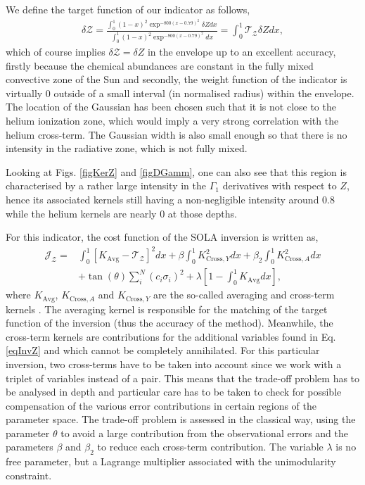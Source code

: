 \documentclass[a4paper,fleqn,usenatbib]{mnras}
\begin{document}
We define the target function of our indicator as follows,
\begin{align}
\delta \mathcal{Z}= \frac{\int_{0}^{1} (1-x)^{2} \exp^{-800(x-0.79)^{2}} \delta Z dx}{\int_{0}^{1} (1-x)^{2} \exp^{-800(x-0.79)^{2}}dx} = \int_{0}^{1}\mathcal{T}_{\mathcal{Z}} \delta Z dx \label{eq:TarZ},
\end{align}
which of course implies $\delta \mathcal{Z} = \delta Z$ in the envelope up to an excellent accuracy, firstly because the chemical abundances are constant in the fully mixed convective zone of the Sun and secondly, the weight function of the indicator is virtually $0$ outside of a small interval (in normalised radius) within the envelope. The location of the Gaussian has been chosen such that it is not close to the helium ionization zone, which would imply a very strong correlation with the helium cross-term. The Gaussian width is also small enough so that there is no intensity in the radiative zone, which is not fully mixed. 

Looking at Figs. \ref{figKerZ} and \ref{figDGamm}, one can also see that this region is characterised by a rather large intensity in the $\Gamma_{1}$ derivatives with respect to $Z$, hence its associated kernels still having a non-negligible intensity around $0.8$ while the helium kernels are nearly $0$ at those depths. 

For this indicator, the cost function of the SOLA inversion is written as,
\begin{align}
\mathcal{J}_{\mathcal{Z}} = & \int_{0}^{1}\left[ K_{\mathrm{Avg}}-\mathcal{T}_{\mathcal{Z}}\right]^{2}dx +\beta \int_{0}^{1}K^ {2}_{\mathrm{Cross},Y}dx +\beta_{2} \int_{0}^{1}K^ {2}_{\mathrm{Cross},A}dx\nonumber \\
& + \tan(\theta) \sum^{N}_{i}(c_{i}\sigma_{i})^{2} +\lambda\left[1-\int_{0}^{1}K_{\mathrm{Avg}}dx\right], \label{eqCostSola}
\end{align}
where $K_{\mathrm{Avg}}$, $K_{\mathrm{Cross},A}$ and $K_{\mathrm{Cross},Y}$ are the so-called averaging and cross-term kernels \citep{Pijpers}. The averaging kernel is responsible for the matching of the target function of the inversion (thus the accuracy of the method). Meanwhile, the cross-term kernels are contributions for the additional variables found in Eq. \ref{eqInvZ} and which cannot be completely annihilated. For this particular inversion, two cross-terms have to be taken into account since we work with a triplet of variables instead of a pair. This means that the trade-off problem \citep{Backus} has to be analysed in depth and particular care has to be taken to check for possible compensation of the various error contributions in certain regions of the parameter space. The trade-off problem is assessed in the classical way, using the parameter $\theta$ to avoid a large contribution from the observational errors and the parameters $\beta$ and $\beta_{2}$ to reduce each cross-term contribution. The variable $\lambda$ is no free parameter, but a Lagrange multiplier associated with the unimodularity constraint. 
\end{document}
